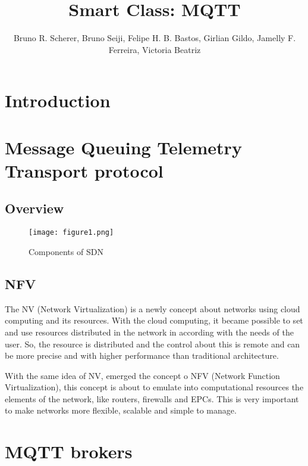\documentclass[12pt]{article}
\title{Smart Class: MQTT}
\author{Bruno R. Scherer\inst{1}, Bruno Seiji\inst{1}, Felipe H. B. Bastos\inst{1}, Girlian Gildo\inst{1}, Jamelly F. Ferreira\inst{1}, Victoria Beatriz\inst{1} }
\begin{document}
 

\maketitle

\begin{abstract}
  

  
  
\end{abstract}
     

\section{Introduction}



\section{Message Queuing Telemetry Transport protocol} \label{sec:sdn}
\subsection{Overview}



\begin{figure}[ht]
\centering
\texttt{[image: figure1.png]}
\caption{Components of SDN}
\label{figure1}
\end{figure}

\subsection{NFV}

The NV (Network Virtualization) is a newly concept about networks using cloud computing and its resources. With the cloud computing, it became possible to set and use resources distributed in the network in according with the needs of the user. So, the resource is distributed and the control about this is remote and can be more precise and with higher performance than traditional architecture.

With the same idea of NV, emerged the concept o NFV (Network Function Virtualization), this concept is about to emulate into computational resources the elements of the network, like routers, firewalls and EPCs. This is very important to make networks more flexible, scalable and simple to manage.

\section{MQTT brokers}
\end{document}
